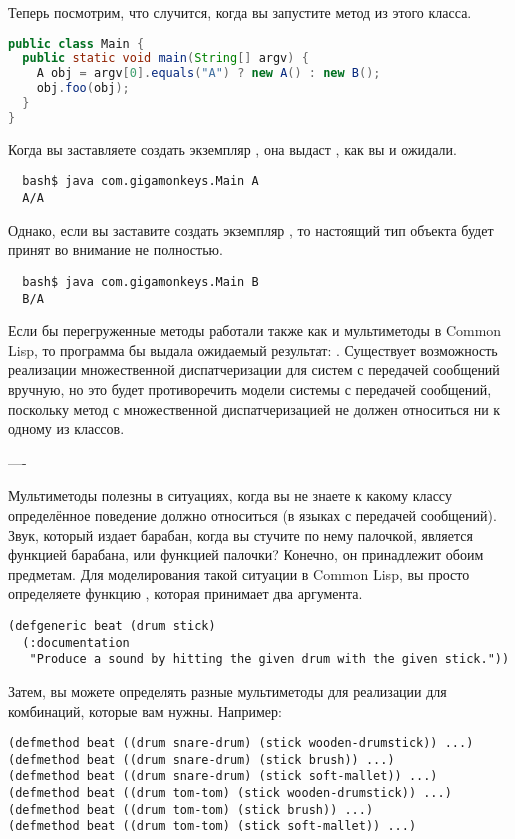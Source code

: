 Теперь посмотрим, что случится, когда вы запустите метод  из этого класса.

\begin{lstlisting}[language=java]
public class Main {
  public static void main(String[] argv) {
    A obj = argv[0].equals("A") ? new A() : new B();
    obj.foo(obj);
  }
}
\end{lstlisting}

Когда вы заставляете  создать экземпляр , она выдаст , как вы и
ожидали.

\begin{verbatim}
  bash$ java com.gigamonkeys.Main A
  A/A
\end{verbatim}

Однако, если вы заставите  создать экземпляр , то настоящий тип объекта
 будет принят во внимание не полностью.

\begin{verbatim}
  bash$ java com.gigamonkeys.Main B
  B/A
\end{verbatim}

Если бы перегруженные методы работали также как и мультиметоды в Common Lisp, то программа
бы выдала ожидаемый результат: .  Существует возможность реализации
множественной диспатчеризации для систем с передачей сообщений вручную, но это будет
противоречить модели системы с передачей сообщений, поскольку метод с множественной
диспатчеризацией не должен относиться ни к одному из классов.

----

Мультиметоды полезны в ситуациях, когда вы не знаете к какому классу определённое
поведение должно относиться (в языках с передачей сообщений).  Звук, который издает
барабан, когда вы стучите по нему палочкой, является функцией барабана, или функцией
палочки?  Конечно, он принадлежит обоим предметам.  Для моделирования такой ситуации в
Common Lisp, вы просто определяете функцию , которая принимает два аргумента.

\begin{lstlisting}
(defgeneric beat (drum stick)
  (:documentation
   "Produce a sound by hitting the given drum with the given stick."))
\end{lstlisting}

Затем, вы можете определять разные мультиметоды для реализации  для комбинаций,
которые вам нужны. Например:

\begin{lstlisting}
(defmethod beat ((drum snare-drum) (stick wooden-drumstick)) ...)
(defmethod beat ((drum snare-drum) (stick brush)) ...)
(defmethod beat ((drum snare-drum) (stick soft-mallet)) ...)
(defmethod beat ((drum tom-tom) (stick wooden-drumstick)) ...)
(defmethod beat ((drum tom-tom) (stick brush)) ...)
(defmethod beat ((drum tom-tom) (stick soft-mallet)) ...)
\end{lstlisting}


